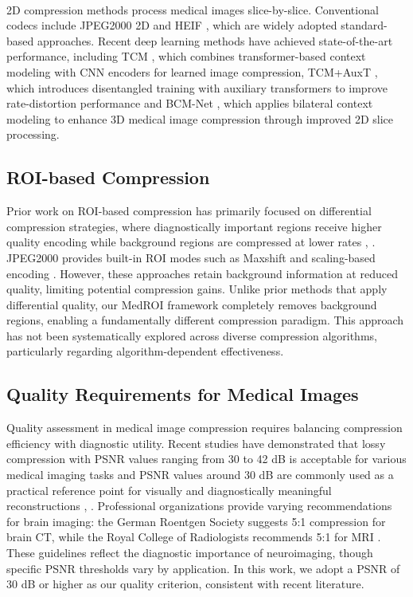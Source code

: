 \documentclass[runningheads]{llncs}
\begin{document}
\paragraph{}2D compression methods process medical images slice-by-slice. Conventional codecs include JPEG2000 2D \cite{jpeg} and HEIF \cite{heif}, which are widely adopted standard-based approaches. Recent deep learning methods have achieved state-of-the-art performance, including TCM \cite{tcm}, which combines transformer-based context modeling with CNN encoders for learned image compression, TCM+AuxT \cite{tcm+auxt}, which introduces disentangled training with auxiliary transformers to improve rate-distortion performance and BCM-Net \cite{bcm}, which applies bilateral context modeling to enhance 3D medical image compression through improved 2D slice processing.

\subsection{ROI-based Compression} 
Prior work on ROI-based compression has primarily focused on differential compression strategies, where diagnostically important regions receive higher quality encoding while background regions are compressed at lower rates \cite{Ting2015}, \cite{Li2025}. JPEG2000 provides built-in ROI modes such as Maxshift and scaling-based encoding \cite{jpeg}. However, these approaches retain background information at reduced quality, limiting potential compression gains. Unlike prior methods that apply differential quality, our MedROI framework completely removes background regions, enabling a fundamentally different compression paradigm. This approach has not been systematically explored across diverse compression algorithms, particularly regarding algorithm-dependent effectiveness.

\subsection{Quality Requirements for Medical Images}
Quality assessment in medical image compression requires balancing compression efficiency with diagnostic utility. Recent studies have demonstrated that lossy compression with PSNR values ranging from 30 to 42 dB is acceptable for various medical imaging tasks \cite{Shei2025}and PSNR values around 30 dB are commonly used as a practical reference point for visually and diagnostically meaningful reconstructions \cite{Prakash2021}, \cite{Baiee2024}. Professional organizations provide varying recommendations for brain imaging: the German Roentgen Society suggests 5:1 compression for brain CT, while the Royal College of Radiologists recommends 5:1 for MRI \cite{Liu2017}. These guidelines reflect the diagnostic importance of neuroimaging, though specific PSNR thresholds vary by application. In this work, we adopt a PSNR of 30 dB or higher as our quality criterion, consistent with recent literature.
\end{document}
